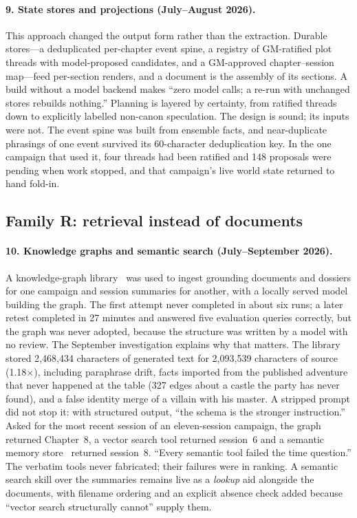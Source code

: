\documentclass[11pt]{article}
\begin{document}
\paragraph{9. State stores and projections (July--August 2026).}
This approach changed the output form rather than the extraction. Durable stores---a deduplicated
per-chapter event spine, a registry of GM-ratified plot threads with model-proposed candidates, and a
GM-approved chapter--session map---feed per-section renders, and a document is the assembly of its
sections. A build without a model backend makes ``zero model calls; a re-run with unchanged stores
rebuilds nothing.'' Planning is layered by certainty, from ratified threads down to explicitly labelled
non-canon speculation. The design is sound; its inputs were not. The event spine was built from
ensemble facts, and near-duplicate phrasings of one event survived its 60-character deduplication key.
In the one campaign that used it, four threads had been ratified and 148 proposals were pending when work
stopped, and that campaign's live world state returned to hand fold-in.

\subsection{Family R: retrieval instead of documents}

\paragraph{10. Knowledge graphs and semantic search (July--September 2026).}
A knowledge-graph library~\cite{cognee} was used to ingest grounding documents and dossiers for one
campaign and session summaries for another, with a locally served model building the graph. The first
attempt never completed in about six runs; a later retest completed in 27 minutes and answered five
evaluation queries correctly, but the graph was never adopted, because the structure was written by a
model with no review. The September investigation explains why that matters. The library stored
2{,}468{,}434 characters of generated text for 2{,}093{,}539 characters of source (1.18$\times$),
including paraphrase drift, facts imported from the published adventure that never happened at the
table (327 edges about a castle the party has never found), and a false identity merge of a villain
with his master. A stripped prompt did not stop it: with structured output, ``the schema is the
stronger instruction.'' Asked for the most recent session of an eleven-session campaign, the graph
returned Chapter~8, a vector search tool returned session~6 and a semantic memory store~\cite{mempalace}
returned session~8. ``Every semantic tool failed the time question.'' The verbatim tools never
fabricated; their failures were in ranking. A semantic search skill over the summaries remains live as
a \emph{lookup} aid alongside the documents, with filename ordering and an explicit absence check added
because ``vector search structurally cannot'' supply them.
\end{document}
